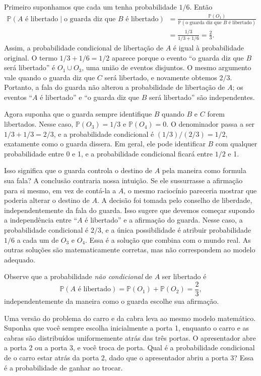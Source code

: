 Primeiro suponhamos que cada um tenha probabilidade $1/6$. Então
\[
\begin{aligned}
\mathbb{P}(A\text{ é libertado}\mid\text{o guarda diz que }B\text{ é libertado})
&=\frac{\mathbb{P}(O_1)}{\mathbb{P}(\text{o guarda diz que }B\text{ é libertado})}\\
&=\frac{1/3}{1/3+1/6}=\frac23.
\end{aligned}
\]
Assim, a probabilidade condicional de libertação de $A$ é igual à probabilidade original. O termo $1/3+1/6=1/2$ aparece porque o evento ``o guarda diz que $B$ será libertado'' é $O_1\cup O_3$, uma união de eventos disjuntos. O mesmo argumento vale quando o guarda diz que $C$ será libertado, e novamente obtemos $2/3$. Portanto, a fala do guarda não alterou a probabilidade de libertação de $A$; os eventos ``$A$ é libertado'' e ``o guarda diz que $B$ será libertado'' são independentes.

Agora suponha que o guarda sempre identifique $B$ quando $B$ e $C$ forem libertados. Nesse caso, $\mathbb{P}(O_3)=1/3$ e $\mathbb{P}(O_4)=0$. O denominador passa a ser $1/3+1/3=2/3$, e a probabilidade condicional é $(1/3)/(2/3)=1/2$, exatamente como o guarda dissera. Em geral, ele pode identificar $B$ com qualquer probabilidade entre 0 e 1, e a probabilidade condicional ficará entre $1/2$ e 1.

Isso significa que o guarda controla o destino de $A$ pela maneira como formula sua fala? A conclusão contraria nossa intuição. Se ele sussurrasse a afirmação para si mesmo, em vez de contá-la a $A$, o mesmo raciocínio pareceria mostrar que poderia alterar o destino de $A$. A decisão foi tomada pelo conselho de liberdade, independentemente da fala do guarda. Isso sugere que devemos começar supondo a independência entre ``$A$ é libertado'' e a afirmação do guarda. Nesse caso, a probabilidade condicional é $2/3$, e a única possibilidade é atribuir probabilidade $1/6$ a cada um de $O_3$ e $O_4$. Essa é a solução que combina com o mundo real. As outras soluções são matematicamente corretas, mas não correspondem ao modelo adequado.

Observe que a probabilidade \emph{não condicional} de $A$ ser libertado é
\[
\mathbb{P}(A\text{ é libertado})=\mathbb{P}(O_1)+\mathbb{P}(O_2)=\frac23,
\]
independentemente da maneira como o guarda escolhe sua afirmação.

Uma versão do problema do carro e da cabra leva ao mesmo modelo matemático. Suponha que você sempre escolha inicialmente a porta 1, enquanto o carro e as cabras são distribuídos uniformemente atrás das três portas. O apresentador abre a porta 2 ou a porta 3, e você troca de porta. Qual é a probabilidade condicional de o carro estar atrás da porta 2, dado que o apresentador abriu a porta 3? Essa é a probabilidade de ganhar ao trocar.

